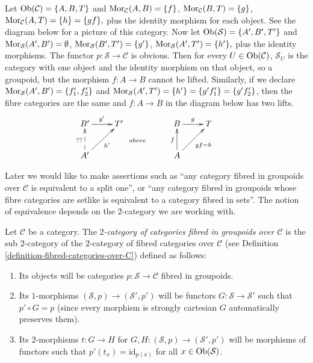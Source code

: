 \begin{example}
\label{example-not-fibred-in-groupoids-but-fibre-cats-are}
Let $\mathop{\mathrm{Ob}}\nolimits(\mathcal{C}) = \{A, B, T\}$ and
$\mathop{\mathrm{Mor}}\nolimits_\mathcal{C}(A, B) = \{f\}$, $\mathop{\mathrm{Mor}}\nolimits_\mathcal{C}(B, T) = \{g\}$,
$\mathop{\mathrm{Mor}}\nolimits_\mathcal{C}(A, T) = \{h\} = \{gf\}, $ plus the identity morphism
for each object. See the diagram below for a picture of this category. Now let
$\mathop{\mathrm{Ob}}\nolimits(\mathcal{S}) = \{A', B', T'\}$ and
$\mathop{\mathrm{Mor}}\nolimits_\mathcal{S}(A', B') = \emptyset$,
$\mathop{\mathrm{Mor}}\nolimits_\mathcal{S}(B', T') = \{g'\}$,
$\mathop{\mathrm{Mor}}\nolimits_\mathcal{S}(A', T') = \{h'\}, $ plus the identity morphisms. The
functor $p : \mathcal{S} \to \mathcal{C}$ is obvious. Then for every
$U \in \mathop{\mathrm{Ob}}\nolimits(\mathcal{C})$, $\mathcal{S}_U$ is the category with one
object and the identity morphism on that object, so a groupoid, but the
morphism $f: A \to B$ cannot be lifted. Similarly, if we declare
$\mathop{\mathrm{Mor}}\nolimits_\mathcal{S}(A', B') = \{f'_1, f'_2\}$ and
$ \mathop{\mathrm{Mor}}\nolimits_\mathcal{S}(A', T') = \{h'\} = \{g'f'_1 \} = \{g'f'_2\}$, then
the fibre categories are the same and $f: A \to B$ in the diagram below has
two lifts.
$$
\xymatrix{
B' \ar[r]^{g'} & T' & & B \ar[r]^g & T & \\
A' \ar@{-->}[u]^{??} \ar[ru]_{h'} & & \ar@{}[u]^{above} &
A \ar[u]^f \ar[ru]_{gf = h} & \\
}
$$
\end{example}

\noindent
Later we would like to make assertions such as ``any category fibred in
groupoids over $\mathcal{C}$ is equivalent to a split one'', or
``any category fibred in groupoids whose fibre categories are setlike
is equivalent to a category fibred in sets''. The notion of equivalence
depends on the $2$-category we are working with.

\begin{definition}
\label{definition-categories-fibred-in-groupoids-over-C}
Let $\mathcal{C}$ be a category.
The {\it $2$-category of categories fibred in groupoids over $\mathcal{C}$}
is the sub $2$-category of the $2$-category of fibred categories
over $\mathcal{C}$ (see Definition \ref{definition-fibred-categories-over-C})
defined as follows:
\begin{enumerate}
\item Its objects will be categories
$p : \mathcal{S} \to \mathcal{C}$ fibred in groupoids.
\item Its $1$-morphisms $(\mathcal{S}, p) \to (\mathcal{S}', p')$
will be functors $G : \mathcal{S} \to \mathcal{S}'$ such that
$p' \circ G = p$ (since every morphism is strongly cartesian
$G$ automatically preserves them).
\item Its $2$-morphisms $t : G \to H$ for
$G, H : (\mathcal{S}, p) \to (\mathcal{S}', p')$
will be morphisms of functors
such that $p'(t_x) = \text{id}_{p(x)}$
for all $x \in \mathop{\mathrm{Ob}}\nolimits(\mathcal{S})$.
\end{enumerate}
\end{definition}

